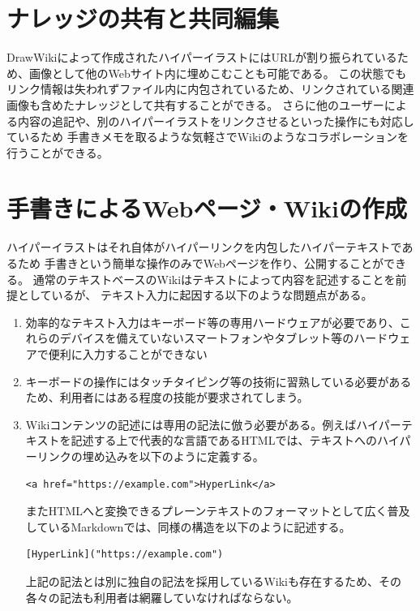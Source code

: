 \section{ナレッジの共有と共同編集}
DrawWikiによって作成されたハイパーイラストにはURLが割り振られているため、画像として他のWebサイト内に埋めこむことも可能である。
この状態でもリンク情報は失われずファイル内に内包されているため、リンクされている関連画像も含めたナレッジとして共有することができる。
さらに他のユーザーによる内容の追記や、別のハイパーイラストをリンクさせるといった操作にも対応しているため
手書きメモを取るような気軽さでWikiのようなコラボレーションを行うことができる。


\section{手書きによるWebページ・Wikiの作成}
\label{tegakiwiki}
ハイパーイラストはそれ自体がハイパーリンクを内包したハイパーテキストであるため
手書きという簡単な操作のみでWebページを作り、公開することができる。
通常のテキストベースのWikiはテキストによって内容を記述することを前提としているが、
テキスト入力に起因する以下のような問題点がある。
\begin{enumerate}
    \item 効率的なテキスト入力はキーボード等の専用ハードウェアが必要であり、これらのデバイスを備えていないスマートフォンやタブレット等のハードウェアで便利に入力することができない
    \item キーボードの操作にはタッチタイピング等の技術に習熟している必要があるため、利用者にはある程度の技能が要求されてしまう。
    \item Wikiコンテンツの記述には専用の記法に倣う必要がある。例えばハイパーテキストを記述する上で代表的な言語であるHTMLでは、テキストへのハイパーリンクの埋め込みを以下のように定義する。
    \begin{lstlisting}[caption=htmlにおけるハイパーリンクの定義, label=htmlhyperlinking]
        <a href="https://example.com">HyperLink</a>
    \end{lstlisting}
    またHTMLへと変換できるプレーンテキストのフォーマットとして広く普及しているMarkdownでは、同様の構造を以下のように記述する。
    \begin{lstlisting}[caption=MarkDownにおけるハイパーリンクの定義, label=mdhyperlinking]
        [HyperLink]("https://example.com")
    \end{lstlisting}
    上記の記法とは別に独自の記法を採用しているWikiも存在するため、その各々の記法も利用者は網羅していなければならない。
\end{enumerate}

